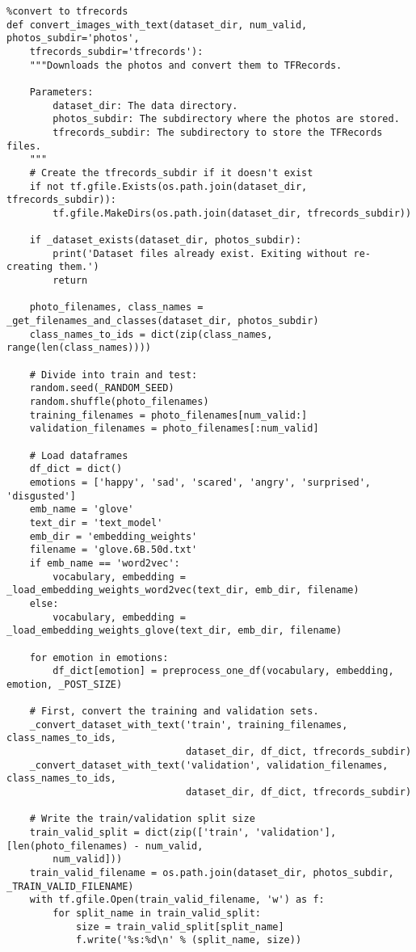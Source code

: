 \begin{lstlisting}
%convert to tfrecords
def convert_images_with_text(dataset_dir, num_valid, photos_subdir='photos', 
    tfrecords_subdir='tfrecords'):
    """Downloads the photos and convert them to TFRecords.

    Parameters:
        dataset_dir: The data directory.
        photos_subdir: The subdirectory where the photos are stored.
        tfrecords_subdir: The subdirectory to store the TFRecords files.
    """
    # Create the tfrecords_subdir if it doesn't exist
    if not tf.gfile.Exists(os.path.join(dataset_dir, tfrecords_subdir)):
        tf.gfile.MakeDirs(os.path.join(dataset_dir, tfrecords_subdir))

    if _dataset_exists(dataset_dir, photos_subdir):
        print('Dataset files already exist. Exiting without re-creating them.')
        return

    photo_filenames, class_names = _get_filenames_and_classes(dataset_dir, photos_subdir)
    class_names_to_ids = dict(zip(class_names, range(len(class_names))))

    # Divide into train and test:
    random.seed(_RANDOM_SEED)
    random.shuffle(photo_filenames)
    training_filenames = photo_filenames[num_valid:]
    validation_filenames = photo_filenames[:num_valid]

    # Load dataframes
    df_dict = dict()
    emotions = ['happy', 'sad', 'scared', 'angry', 'surprised', 'disgusted']
    emb_name = 'glove'
    text_dir = 'text_model'
    emb_dir = 'embedding_weights'
    filename = 'glove.6B.50d.txt'
    if emb_name == 'word2vec':
        vocabulary, embedding = _load_embedding_weights_word2vec(text_dir, emb_dir, filename)
    else:
        vocabulary, embedding = _load_embedding_weights_glove(text_dir, emb_dir, filename)

    for emotion in emotions:
        df_dict[emotion] = preprocess_one_df(vocabulary, embedding, emotion, _POST_SIZE)

    # First, convert the training and validation sets.
    _convert_dataset_with_text('train', training_filenames, class_names_to_ids,
                               dataset_dir, df_dict, tfrecords_subdir)
    _convert_dataset_with_text('validation', validation_filenames, class_names_to_ids,
                               dataset_dir, df_dict, tfrecords_subdir)

    # Write the train/validation split size
    train_valid_split = dict(zip(['train', 'validation'], [len(photo_filenames) - num_valid, 
        num_valid]))
    train_valid_filename = os.path.join(dataset_dir, photos_subdir, _TRAIN_VALID_FILENAME)
    with tf.gfile.Open(train_valid_filename, 'w') as f:
        for split_name in train_valid_split:
            size = train_valid_split[split_name]
            f.write('%s:%d\n' % (split_name, size))


\end{lstlisting}
